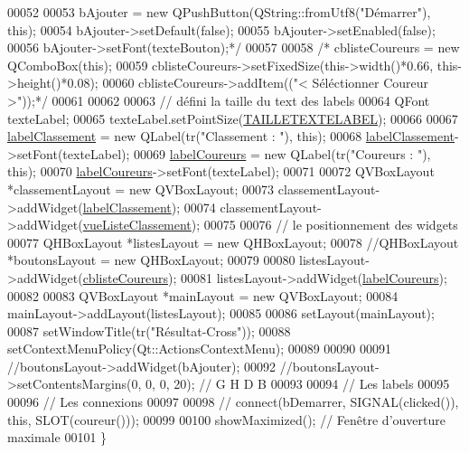 \begin{DoxyCode}
00052 \textcolor{comment}{}
00053 \textcolor{comment}{    bAjouter = new QPushButton(QString::fromUtf8("Démarrer"), this);}
00054 \textcolor{comment}{    bAjouter->setDefault(false);}
00055 \textcolor{comment}{    bAjouter->setEnabled(false);}
00056 \textcolor{comment}{    bAjouter->setFont(texteBouton);*/}
00057 
00058    \textcolor{comment}{/* cblisteCoureurs = new QComboBox(this);}
00059 \textcolor{comment}{    cblisteCoureurs->setFixedSize(this->width()*0.66, this->height()*0.08);}
00060 \textcolor{comment}{    cblisteCoureurs->addItem(("< Séléctionner Coureur >"));*/}
00061 
00062 
00063     \textcolor{comment}{// défini la taille du text des labels}
00064     QFont texteLabel;
00065     texteLabel.setPointSize(\hyperlink{ihmchronocross_8h_a407f067284fd7ac16426ac29cbfcd356}{TAILLETEXTELABEL});
00066 
00067     \hyperlink{class_i_h_m_resultats_cross_a455bc28e3605cd327067be2db255c911}{labelClassement} = \textcolor{keyword}{new} QLabel(tr(\textcolor{stringliteral}{"Classement : "}), \textcolor{keyword}{this});
00068     \hyperlink{class_i_h_m_resultats_cross_a455bc28e3605cd327067be2db255c911}{labelClassement}->setFont(texteLabel);
00069     \hyperlink{class_i_h_m_resultats_cross_a0cec9448e3ac680fd93cff9c4c709e1b}{labelCoureurs} = \textcolor{keyword}{new} QLabel(tr(\textcolor{stringliteral}{"Coureurs : "}), \textcolor{keyword}{this});
00070     \hyperlink{class_i_h_m_resultats_cross_a0cec9448e3ac680fd93cff9c4c709e1b}{labelCoureurs}->setFont(texteLabel);
00071 
00072     QVBoxLayout *classementLayout = \textcolor{keyword}{new} QVBoxLayout;
00073     classementLayout->addWidget(\hyperlink{class_i_h_m_resultats_cross_a455bc28e3605cd327067be2db255c911}{labelClassement});
00074     classementLayout->addWidget(\hyperlink{class_i_h_m_resultats_cross_a8f35fc63f8c3a1351658d3148daf13e0}{vueListeClassement});
00075 
00076     \textcolor{comment}{// le positionnement des widgets}
00077     QHBoxLayout *listesLayout = \textcolor{keyword}{new} QHBoxLayout;
00078     \textcolor{comment}{//QHBoxLayout *boutonsLayout = new QHBoxLayout;}
00079 
00080     listesLayout->addWidget(\hyperlink{class_i_h_m_resultats_cross_ae1190e783fc117504abf614fe170ad54}{cblisteCoureurs});
00081     listesLayout->addWidget(\hyperlink{class_i_h_m_resultats_cross_a0cec9448e3ac680fd93cff9c4c709e1b}{labelCoureurs});
00082 
00083     QVBoxLayout *mainLayout = \textcolor{keyword}{new} QVBoxLayout;
00084     mainLayout->addLayout(listesLayout);
00085 
00086     setLayout(mainLayout);
00087     setWindowTitle(tr(\textcolor{stringliteral}{"Résultat-Cross"}));
00088     setContextMenuPolicy(Qt::ActionsContextMenu);
00089 
00090 
00091     \textcolor{comment}{//boutonsLayout->addWidget(bAjouter);}
00092     \textcolor{comment}{//boutonsLayout->setContentsMargins(0, 0, 0, 20); // G H D B}
00093 
00094     \textcolor{comment}{// Les labels}
00095 
00096     \textcolor{comment}{// Les connexions}
00097 
00098     \textcolor{comment}{// connect(bDemarrer, SIGNAL(clicked()), this, SLOT(coureur()));}
00099 
00100     showMaximized(); \textcolor{comment}{// Fenêtre d'ouverture maximale}
00101 \}
\end{DoxyCode}

